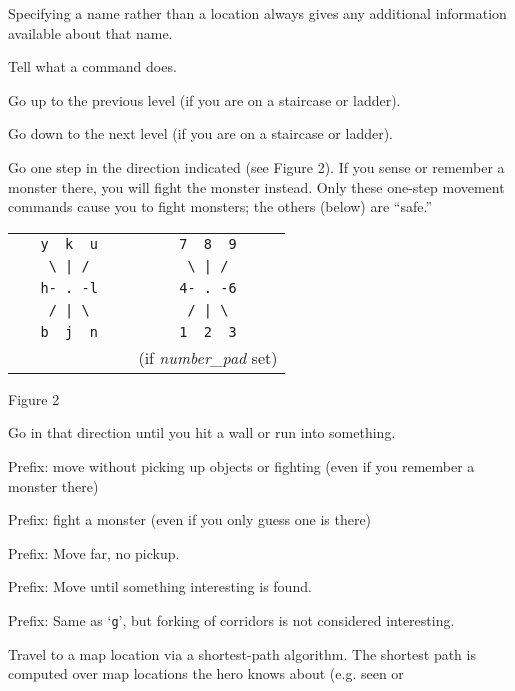 Specifying a name rather than a location
always gives any additional information available about that name.
\item[\tb{\&}]
Tell what a command does.
\item[\tb{<}]
Go up to the previous level (if you are on a staircase or ladder).
\item[\tb{>}]
Go down to the next level (if you are on a staircase or ladder).
\item[\tb{[yuhjklbn]}]
Go one step in the direction indicated (see Figure 2).  If you sense
or remember
a monster there, you will fight the monster instead.  Only these
one-step movement commands cause you to fight monsters; the others
(below) are ``safe.''
\begin{center}
\begin{tabular}{cc}
\verb+   y  k  u   + & \verb+   7  8  9   +\\
\verb+    \ | /    + & \verb+    \ | /    +\\
\verb+   h- . -l   + & \verb+   4- . -6   +\\
\verb+    / | \    + & \verb+    / | \    +\\
\verb+   b  j  n   + & \verb+   1  2  3   +\\
                     & (if {\it number\_pad\/} set)
\end{tabular}
\end{center}
\begin{center}
Figure 2
\end{center}
\item[\tb{[YUHJKLBN]}]
Go in that direction until you hit a wall or run into something.
\item[\tb{m[yuhjklbn]}]
Prefix:  move without picking up objects or fighting (even if you remember
a monster there)
\item[\tb{F[yuhjklbn]}]
Prefix:  fight a monster (even if you only guess one is there)
\item[\tb{M[yuhjklbn]}]
Prefix:  Move far, no pickup.
\item[\tb{g[yuhjklbn]}]
Prefix:  Move until something interesting is found.
\item[\tb{G[yuhjklbn] {\rm or} <CONTROL->[yuhjklbn]}]
Prefix:  Same as `{\tt g}', but forking of corridors is not considered
interesting.
\item[\tb{_}]
Travel to a map location via a shortest-path algorithm.  The shortest path
is computed over map locations the hero knows about (e.g. seen or

